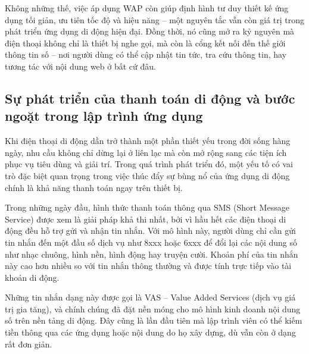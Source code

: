   \begin{flushleft}
  \hspace*{0.8cm}Không những thế, việc áp dụng WAP còn giúp định hình tư duy thiết kế ứng dụng tối giản, ưu tiên tốc độ và hiệu năng – một nguyên tắc vẫn còn giá trị trong phát triển ứng dụng di động hiện đại. Đồng thời, nó cũng mở ra kỷ nguyên mà điện thoại không chỉ là thiết bị nghe gọi, mà còn là cổng kết nối đến thế giới thông tin số – nơi người dùng có thể cập nhật tin tức, tra cứu thông tin, hay tương tác với nội dung web ở bất cứ đâu.
  \end{flushleft}

\subsection{Sự phát triển của thanh toán di động và bước ngoặt trong lập trình ứng dụng}
\renewcommand{\labelitemi}{--}

\begin{flushleft}
\hspace*{0.8cm}Khi điện thoại di động dần trở thành một phần thiết yếu trong đời sống hàng ngày, nhu cầu không chỉ dừng lại ở liên lạc mà còn mở rộng sang các tiện ích phục vụ tiêu dùng và giải trí. Trong quá trình phát triển đó, một yếu tố có vai trò đặc biệt quan trọng trong việc thúc đẩy sự bùng nổ của ứng dụng di động chính là khả năng thanh toán ngay trên thiết bị.
\end{flushleft}

\begin{flushleft}
\hspace*{0.8cm}Trong những ngày đầu, hình thức thanh toán thông qua SMS (Short Message Service) được xem là giải pháp khả thi nhất, bởi vì hầu hết các điện thoại di động đều hỗ trợ gửi và nhận tin nhắn. Với mô hình này, người dùng chỉ cần gửi tin nhắn đến một đầu số dịch vụ như 8xxx hoặc 6xxx để đổi lại các nội dung số như nhạc chuông, hình nền, hình động hay truyện cười. Khoản phí của tin nhắn này cao hơn nhiều so với tin nhắn thông thường và được tính trực tiếp vào tài khoản di động.
\end{flushleft}

\begin{flushleft}
\hspace*{0.8cm}Những tin nhắn dạng này được gọi là VAS – Value Added Services (dịch vụ giá trị gia tăng), và chính chúng đã đặt nền móng cho mô hình kinh doanh nội dung số trên nền tảng di động. Đây cũng là lần đầu tiên mà lập trình viên có thể kiếm tiền thông qua các ứng dụng hoặc nội dung do họ xây dựng, dù vẫn còn ở dạng rất đơn giản.
\end{flushleft}

